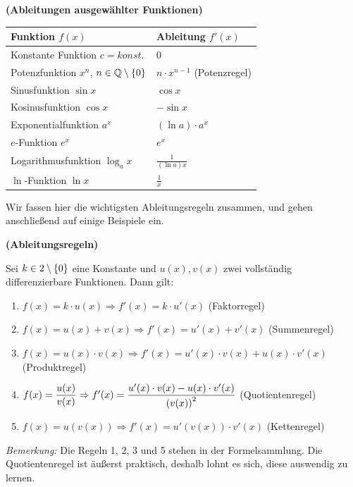 \documentclass[ngerman, 12pt]{nssheetxea}
\begin{document}
\begin{theorem}\textbf{(Ableitungen ausgewählter Funktionen)} \par
\renewcommand{\arraystretch}{1.3}
\begin{tabularx}{\textwidth}{X | X}

\textbf{Funktion $f(x)$} & \textbf{Ableitung $f'(x)$} \\
\hline
Konstante Funktion \hfill $c=konst.$ & $0$ \\
\hline
Potenzfunktion \hfill $x^n$, $n\in\mathbb{Q} \setminus \{ 0 \}$ & $n\cdot x^{n-1}$ (Potenzregel) \\
\hline
Sinusfunktion \hfill $\sin x$ & $\cos x$ \\
\hline
Kosinusfunktion \hfill $\cos x$ & $-\sin x$ \\
\hline
Exponentialfunktion \hfill $a^x$ & $(\ln a)\cdot a^x$ \\
\hline
$e$-Funktion \hfill $e^x$ & $e^x$ \\
\hline
Logarithmusfunktion \hfill $\log_a x$ & $\frac{1}{(\ln a) x}$\\
\hline
$\ln$-Funktion \hfill $\ln x$ & $\frac{1}{x}$ \\
\end{tabularx}
\renewcommand{\arraystretch}{1}
\label{Satz:Ableitungen_Funktionen}
\end{theorem}

Wir fassen hier die wichtigsten Ableitungsregeln zusammen, und gehen anschließend auf einige Beispiele ein.

\begin{theorem} \textbf{(Ableitungsregeln)} \par
Sei $k\in 2 \setminus \{ 0 \}$ eine Konstante und $u(x), v(x)$ zwei vollständig differenzierbare Funktionen. Dann gilt:
\begin{enumerate}
\item $f(x)= k \cdot u(x) \Rightarrow f'(x)=k \cdot u'(x)$ (Faktorregel)
\item $f(x)=u(x)+v(x) \Rightarrow f'(x)=u'(x)+v'(x)$ (Summenregel)
\item $f(x)=u(x) \cdot v(x) \Rightarrow f'(x)=u'(x)\cdot v(x) + u(x)\cdot v'(x)$ (Produktregel)
\item $f(x)=\dfrac{u(x)}{v(x)} \Rightarrow f'(x)=\dfrac{u'(x)\cdot v(x) - u(x) \cdot v'(x)}{\mleft( v(x) \mright)^2}$ (Quotientenregel)
\item $f(x)=u(v(x)) \Rightarrow f'(x)=u'(v(x))\cdot v'(x)$ (Kettenregel)
\end{enumerate}
\textit{Bemerkung:} Die Regeln 1, 2, 3 und 5 stehen in der Formelsammlung. Die Quotientenregel ist äußerst praktisch, deshalb lohnt es sich, diese auswendig zu lernen.
\label{Satz:Ableitungsregeln}
    
\end{theorem}
 
\end{document}
